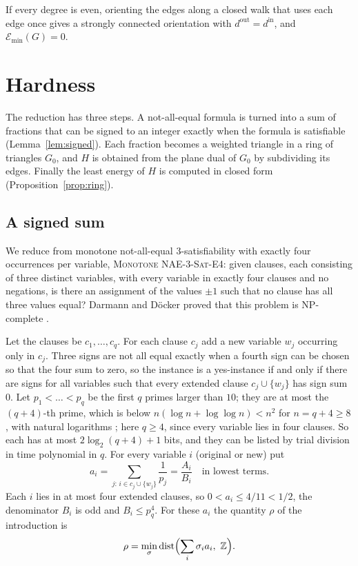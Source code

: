\documentclass[11pt]{amsart}
\theoremstyle{definition}
\theoremstyle{remark}
\numberwithin{equation}{section}
\DeclareMathOperator{\dist}{dist}
\newcommand{\Emin}{\mathcal E_{\min}}
\newcommand{\Z}{\mathbb Z}
\begin{document}
If every degree is even, orienting the edges along a closed walk that uses each edge once gives a strongly connected orientation with $d^{\mathrm{out}}=d^{\mathrm{in}}$, and $\Emin(G)=0$.

\section{Hardness}\label{sec:hard}

The reduction has three steps. A not-all-equal formula is turned into a sum of fractions that can be signed to an integer exactly when the formula is satisfiable (Lemma~\ref{lem:signed}). Each fraction becomes a weighted triangle in a ring of triangles $G_0$, and $H$ is obtained from the plane dual of $G_0$ by subdividing its edges. Finally the least energy of $H$ is computed in closed form (Proposition~\ref{prop:ring}).

\subsection{A signed sum}
We reduce from monotone not-all-equal 3-satisfiability with exactly four occurrences per variable, \textsc{Monotone NAE-3-Sat-E4}: given clauses, each consisting of three distinct variables, with every variable in exactly four clauses and no negations, is there an assignment of the values $\pm1$ such that no clause has all three values equal? Darmann and D\"ocker proved that this problem is NP-complete \cite[Theorem~1]{DD20}.

Let the clauses be $c_1,\dots,c_q$. For each clause $c_j$ add a new variable $w_j$ occurring only in $c_j$. Three signs are not all equal exactly when a fourth sign can be chosen so that the four sum to zero, so the instance is a yes-instance if and only if there are signs for all variables such that every extended clause $c_j\cup\{w_j\}$ has sign sum $0$. Let $p_1<\dots<p_q$ be the first $q$ primes larger than $10$; they are at most the $(q+4)$-th prime, which is below $n(\log n+\log\log n)<n^2$ for $n=q+4\ge8$, with natural logarithms \cite{RS62}; here $q\ge4$, since every variable lies in four clauses. So each has at most $2\log_2(q+4)+1$ bits, and they can be listed by trial division in time polynomial in $q$. For every variable $i$ (original or new) put
\[
a_i=\sum_{j:\,i\in c_j\cup\{w_j\}}\frac1{p_j}=\frac{A_i}{B_i}\quad\text{in lowest terms}.
\]
Each $i$ lies in at most four extended clauses, so $0<a_i\le 4/11<1/2$, the denominator $B_i$ is odd and $B_i\le p_q^4$. For these $a_i$ the quantity $\rho$ of the introduction is
\[
\rho=\min_{\sigma}\dist\Bigl(\sum_i\sigma_ia_i,\ \Z\Bigr).
\]
\end{document}
